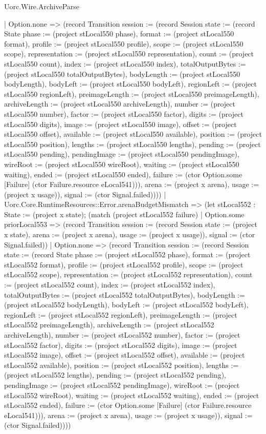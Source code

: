 \begin{lexlean}{Uorc.Wire.ArchiveParse}
\begin{semanticmodule}
{        | Option.none => (record Transition {session := (record Session {state := (record State {phase := (project stLocal550 phase), format := (project stLocal550 format), profile := (project stLocal550 profile), scope := (project stLocal550 scope), representation := (project stLocal550 representation), count := (project stLocal550 count), index := (project stLocal550 index), totalOutputBytes := (project stLocal550 totalOutputBytes), bodyLength := (project stLocal550 bodyLength), bodyLeft := (project stLocal550 bodyLeft), regionLeft := (project stLocal550 regionLeft), preimageLength := (project stLocal550 preimageLength), archiveLength := (project stLocal550 archiveLength), number := (project stLocal550 number), factor := (project stLocal550 factor), digits := (project stLocal550 digits), image := (project stLocal550 image), offset := (project stLocal550 offset), available := (project stLocal550 available), position := (project stLocal550 position), lengths := (project stLocal550 lengths), pending := (project stLocal550 pending), pendingImage := (project stLocal550 pendingImage), wireRoot := (project stLocal550 wireRoot), waiting := (project stLocal550 waiting), ended := (project stLocal550 ended), failure := (ctor Option.some [Failure] (ctor Failure.resource eLocal541))}), arena := (project x arena), usage := (project x usage)}), signal := (ctor Signal.failed)})))
      | Uorc.Core.RuntimeResources::Error.arenaBudgetMismatch => (let stLocal552 : State := (project x state); (match (project stLocal552 failure)
        | Option.some priorLocal553 => (record Transition {session := (record Session {state := (project x state), arena := (project x arena), usage := (project x usage)}), signal := (ctor Signal.failed)})
        | Option.none => (record Transition {session := (record Session {state := (record State {phase := (project stLocal552 phase), format := (project stLocal552 format), profile := (project stLocal552 profile), scope := (project stLocal552 scope), representation := (project stLocal552 representation), count := (project stLocal552 count), index := (project stLocal552 index), totalOutputBytes := (project stLocal552 totalOutputBytes), bodyLength := (project stLocal552 bodyLength), bodyLeft := (project stLocal552 bodyLeft), regionLeft := (project stLocal552 regionLeft), preimageLength := (project stLocal552 preimageLength), archiveLength := (project stLocal552 archiveLength), number := (project stLocal552 number), factor := (project stLocal552 factor), digits := (project stLocal552 digits), image := (project stLocal552 image), offset := (project stLocal552 offset), available := (project stLocal552 available), position := (project stLocal552 position), lengths := (project stLocal552 lengths), pending := (project stLocal552 pending), pendingImage := (project stLocal552 pendingImage), wireRoot := (project stLocal552 wireRoot), waiting := (project stLocal552 waiting), ended := (project stLocal552 ended), failure := (ctor Option.some [Failure] (ctor Failure.resource eLocal541))}), arena := (project x arena), usage := (project x usage)}), signal := (ctor Signal.failed)})))
}
\end{semanticmodule}
\end{lexlean}
